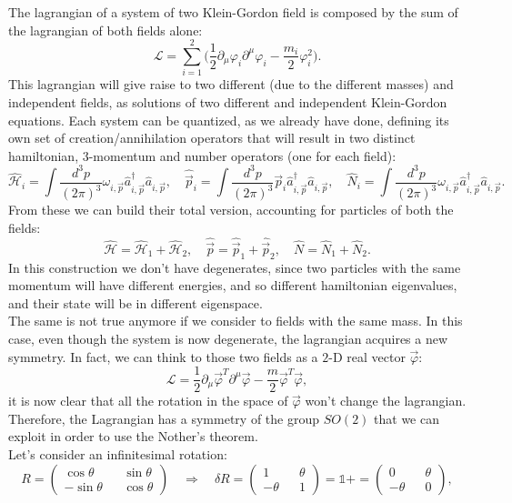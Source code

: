 The lagrangian of a system of two Klein-Gordon field is composed by the sum of the lagrangian of both fields alone:
\begin{equation*}
    \mathcal{L}=\sum_{i=1}^{2}\bigg(\frac{1}{2}\partial_\mu\varphi_i\partial^\mu\varphi_i-\frac{m_i}{2}\varphi_i^2\bigg).
\end{equation*}
This lagrangian will give raise to two different (due to the different masses) and independent fields, as solutions of two different and independent Klein-Gordon equations. Each system can be quantized, as we already have done, defining its own set of creation/annihilation operators that will result in two distinct hamiltonian, 3-momentum and number operators (one for each field):
\begin{equation*}
    \hat{\mathcal{H} }_i=\int\frac{d^3p}{(2\pi)^3}\omega_{i,\vec p}\hat{a}^{\dagger}_{i,\vec p}\hat{a}_{i,\vec p},\quad\hat{\vec p}_i=\int\frac{d^3p}{(2\pi)^3}\vec p_{i}\hat{a}^{\dagger}_{i,\vec p}\hat{a}_{i,\vec p},\quad\hat{N}_i=\int\frac{d^3p}{(2\pi)^3}\omega_{i,\vec p}\hat{a}^{\dagger}_{i,\vec p}\hat{a}_{i,\vec p}.
\end{equation*}
From these we can build their total version, accounting for particles of both the fields:
\begin{equation*}
    \hat{\mathcal{H} }=\hat{\mathcal{H} }_1+\hat{\mathcal{H} }_2,\quad\hat{\vec p }=\hat{\vec p }_1+\hat{\vec p}_2,\quad\hat{N}=\hat{N}_1+\hat{N}_2.
\end{equation*}  
In this construction we don't have degenerates, since two particles with the same momentum will have different energies, and so different hamiltonian eigenvalues, and their state will be in different eigenspace.\\ The same is not true anymore if we consider to fields with the same mass. In this case, even though the system is now degenerate, the lagrangian acquires a new symmetry. In fact, we can think to those two fields as a $2$-D real vector $\vec\varphi$:
\begin{equation}\label{KGLagrangeDensity2F}
    \mathcal{L} =\frac{1}{2}\partial_\mu\vec\varphi^T \partial^\mu\vec\varphi-\frac{m}{2}\vec\varphi^T\vec\varphi,
\end{equation}
it is now clear that all the rotation in the space of $\vec\varphi$ won't change the lagrangian. Therefore, the Lagrangian has a symmetry of the group $SO(2)$ that we can exploit in order to use the Nother's theorem.\\
Let's consider an infinitesimal rotation:
\begin{equation*}
    R=\begin{pmatrix}
        \cos\theta&&\sin\theta\\-\sin\theta&&\cos\theta
    \end{pmatrix}\quad\Rightarrow\quad\delta R=\begin{pmatrix}
        1&&\theta\\-\theta&&1
    \end{pmatrix}=\mathds{1}+=\begin{pmatrix}
        0&&\theta\\-\theta&&0
    \end{pmatrix},
\end{equation*}
